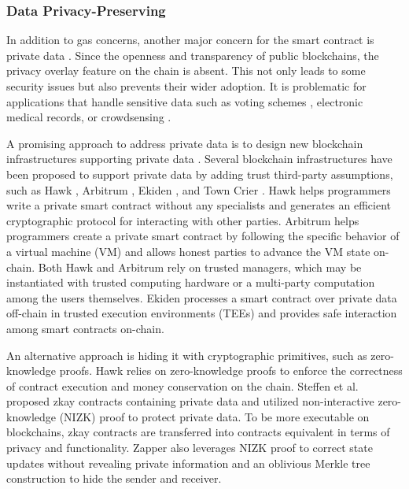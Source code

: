 \documentclass[manuscript,screen]{acmart}
\begin{document}
\subsubsection{Data Privacy-Preserving}
In addition to gas concerns, another major concern for the smart contract is private data \cite{KalodnerGCWF18}. Since the openness and transparency of public blockchains, the privacy overlay feature on the chain is absent. This not only leads to some security issues but also prevents their wider adoption. 
It is problematic for applications that handle sensitive data such as voting schemes \cite{McCorrySH17}, electronic medical records\cite{LiuLYZDG18}, or crowdsensing \cite{PerezZ22}. 

A promising approach to address private data is to design new blockchain infrastructures supporting private data \cite{KosbaMSWP16}. Several blockchain infrastructures have been proposed to support private data by adding trust third-party assumptions, such as Hawk \cite{KosbaMSWP16}, Arbitrum \cite{KalodnerGCWF18}, Ekiden \cite{ChengZKHHJJ0S19}, and Town Crier \cite{zhang2016town}.
Hawk \cite{KosbaMSWP16} helps programmers write a private smart contract without any specialists and generates an efficient cryptographic protocol for interacting with other parties. Arbitrum \cite{KalodnerGCWF18} helps programmers create a private smart contract by following the specific behavior of a virtual machine (VM) and allows honest parties to advance the VM state on-chain. Both Hawk and Arbitrum rely on trusted managers, which may be instantiated with trusted computing hardware or a multi-party computation among the users themselves.
Ekiden \cite{ChengZKHHJJ0S19} processes a smart contract over private data off-chain in trusted execution environments (TEEs) and provides safe interaction among smart contracts on-chain.

An alternative approach is hiding it with cryptographic primitives, such as zero-knowledge proofs. Hawk \cite{KosbaMSWP16} relies on zero-knowledge proofs to enforce the correctness of contract execution and money conservation on the chain.
Steffen et al. \cite{SteffenBGMTV19} proposed zkay contracts containing private data and utilized non-interactive zero-knowledge (NIZK) proof to protect private data. To be more executable on blockchains, zkay contracts are transferred into contracts equivalent in terms of privacy and functionality.
Zapper \cite{SteffenBV22} also leverages NIZK proof to correct state updates without revealing private information and an oblivious Merkle tree construction to hide the sender and receiver.
\end{document}
